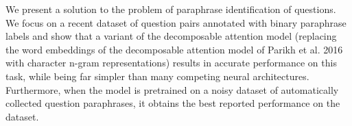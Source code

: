 We present a solution to the problem of paraphrase identification of questions. We focus on a recent dataset of question pairs annotated with binary paraphrase labels and show that a variant of the decomposable attention model (replacing the word embeddings of the decomposable attention model of Parikh et al. 2016 with character n-gram representations) results in accurate performance on this task, while being far simpler than many competing neural architectures. Furthermore, when the model is pretrained on a noisy dataset of automatically collected question paraphrases, it obtains the best reported performance on the dataset.
